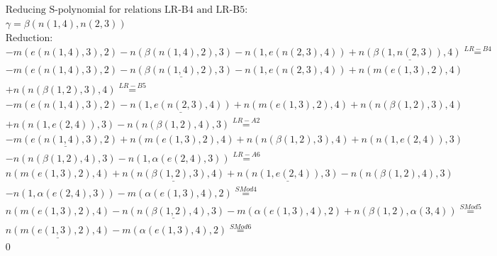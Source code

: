 \documentclass[11pt]{amsart}
\begin{document}
\begin{align*} 
& \text{Reducing S-polynomial for relations LR-B4 and LR-B5:} \\ 
& \gamma = \beta(n(1,4),n(2,3)) \\ 
& \text{Reduction}: \\& - m(e(n(1,4),3),2) - n(\beta(n(1,4),2),3) - n(1,e(n(2,3),4)) + \underline{n(\beta(1,n(2,3)),4)} \stackrel{ LR-B4 }{=}  \\ 
& - m(e(n(1,4),3),2) - \underline{n(\beta(n(1,4),2),3)} - n(1,e(n(2,3),4)) + n(m(e(1,3),2),4)\\ 
 &  + n(n(\beta(1,2),3),4) \stackrel{ LR-B5 }{=}  \\ 
& - m(e(n(1,4),3),2) - \underline{n(1,e(n(2,3),4))} + n(m(e(1,3),2),4) + n(n(\beta(1,2),3),4)\\ 
 &  + n(n(1,e(2,4)),3) - n(n(\beta(1,2),4),3) \stackrel{ LR-A2 }{=}  \\ 
& - \underline{m(e(n(1,4),3),2)} + n(m(e(1,3),2),4) + n(n(\beta(1,2),3),4) + n(n(1,e(2,4)),3)\\ 
 &  - n(n(\beta(1,2),4),3) - n(1,\alpha(e(2,4),3)) \stackrel{ LR-A6 }{=}  \\ 
&n(m(e(1,3),2),4) + \underline{n(n(\beta(1,2),3),4)} + \underline{n(n(1,e(2,4)),3)} - n(n(\beta(1,2),4),3)\\ 
 &  - n(1,\alpha(e(2,4),3)) - m(\alpha(e(1,3),4),2) \stackrel{ SMod4 }{=}  \\ 
&n(m(e(1,3),2),4) - \underline{n(n(\beta(1,2),4),3)} - m(\alpha(e(1,3),4),2) + n(\beta(1,2),\alpha(3,4)) \stackrel{ SMod5 }{=}  \\ 
&\underline{n(m(e(1,3),2),4)} - m(\alpha(e(1,3),4),2) \stackrel{ SMod6 }{=}  \\ 
&0\\ 
\end{align*} 
 
\end{document}
